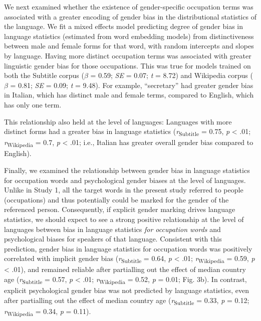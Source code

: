 \documentclass[9pt,twocolumn,twoside]{pnas-new}
\begin{document}
We next examined whether the existence of gender-specific occupation terms was associated with a greater encoding of gender bias in the distributional statistics of the language. We fit a mixed effects model predicting degree of gender bias in language statistics (estimated from word embedding models) from distinctiveness between male and female forms for that word, with random intercepts and slopes by language. Having more distinct occupation terms was associated with greater linguistic gender bias for those occupations. This was true for models trained on both the Subtitle corpus (\(\beta\) = 0.59; \emph{SE} = 0.07; \emph{t} = 8.72) and Wikipedia
corpus (\(\beta\) = 0.81; \emph{SE} = 0.09; \emph{t} = 9.48). For example, \enquote{secretary} had greater gender bias in Italian, which has distinct male and female terms, compared to English, which has only one term. 

This relationship also held at the level of languages: Languages with more
distinct forms had a greater bias in language statistics
(\emph{r}\textsubscript{Subtitle} = 0.75, \emph{p} \textless{} .01; \emph{r}\textsubscript{Wikipedia} = 0.7, \emph{p} \textless{} .01; i.e., Italian has greater overall gender bias compared to English).

Finally, we examined the relationship between gender bias in language
statistics for occupation words and psychological gender biases at the level of languages.
Unlike in Study 1, all the target words in the present study referred to
people (occupations) and thus potentially could be marked for the gender
of the referenced person. Consequently, if explicit gender marking
drives language statistics, we should expect to see a strong positive
relationship at the level of languages between bias in language
statistics \emph{for occupation words} and psychological biases for
speakers of that language. Consistent with this prediction, gender bias
in language statistics for occupation words was positively correlated
with implicit gender bias (\emph{r}\textsubscript{Subtitle} = 0.64, \emph{p}
\textless{} .01; \emph{r}\textsubscript{Wikipedia}  = 0.59, \emph{p} \textless{} .01),
and remained reliable after partialling out the effect of median country
age (\emph{r}\textsubscript{Subtitle} = 0.57, \emph{p} \textless{} .01; \emph{r}\textsubscript{Wikipedia}  = 0.52, \emph{p} = 0.01; Fig. 3b). In contrast,  explicit psychological gender bias was not predicted by language statistics, even after partialling out the effect of median country age (\emph{r}\textsubscript{Subtitle} = 0.33, \emph{p} = 0.12;
\emph{r}\textsubscript{Wikipedia} = 0.34, \emph{p} = 0.11).
\end{document}

